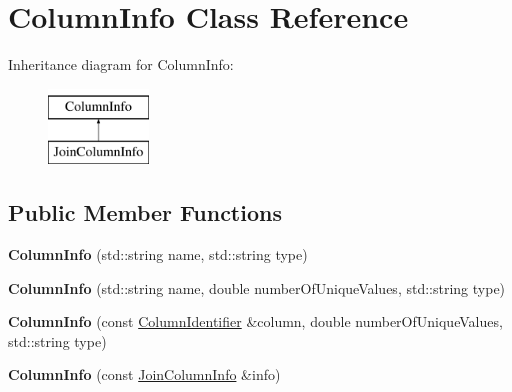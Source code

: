 \hypertarget{class_column_info}{\section{Column\+Info Class Reference}
\label{class_column_info}
}
Inheritance diagram for Column\+Info\+:\begin{figure}[H]
\begin{center}
\leavevmode
\includegraphics[height=2.000000cm]{class_column_info}
\end{center}
\end{figure}
\subsection*{Public Member Functions}
\begin{DoxyCompactItemize}
\item 
\hypertarget{class_column_info_a1068047ba3c85b84076e69619f64123a}{{\bfseries Column\+Info} (std\+::string name, std\+::string type)}\label{class_column_info_a1068047ba3c85b84076e69619f64123a}

\item 
\hypertarget{class_column_info_ae8dc9720185a9312e3b33b2ecb92ba7e}{{\bfseries Column\+Info} (std\+::string name, double number\+Of\+Unique\+Values, std\+::string type)}\label{class_column_info_ae8dc9720185a9312e3b33b2ecb92ba7e}

\item 
\hypertarget{class_column_info_a64cd8f7c77b3fe41434b85b05fa88344}{{\bfseries Column\+Info} (const \hyperlink{class_column_identifier}{Column\+Identifier} \&column, double number\+Of\+Unique\+Values, std\+::string type)}\label{class_column_info_a64cd8f7c77b3fe41434b85b05fa88344}

\item 
\hypertarget{class_column_info_af5487ed1e204fe47f66414f7570eb649}{{\bfseries Column\+Info} (const \hyperlink{class_join_column_info}{Join\+Column\+Info} \&info)}\label{class_column_info_af5487ed1e204fe47f66414f7570eb649}

\end{DoxyCompactItemize}
